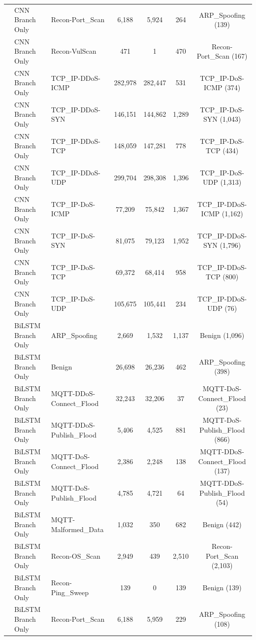 \documentclass[a4paper,fleqn]{cas-sc}
\begin{document}
\begin{landscape}
\begin{longtable}{lllcccc}
 & CNN Branch Only & Recon-Port\_Scan & 6,188 & 5,924 & 264 & ARP\_Spoofing (139) \\
 & CNN Branch Only & Recon-VulScan & 471 & 1 & 470 & Recon-Port\_Scan (167) \\
 & CNN Branch Only & TCP\_IP-DDoS-ICMP & 282,978 & 282,447 & 531 & TCP\_IP-DoS-ICMP (374) \\
 & CNN Branch Only & TCP\_IP-DDoS-SYN & 146,151 & 144,862 & 1,289 & TCP\_IP-DoS-SYN (1,043) \\
 & CNN Branch Only & TCP\_IP-DDoS-TCP & 148,059 & 147,281 & 778 & TCP\_IP-DoS-TCP (434) \\
 & CNN Branch Only & TCP\_IP-DDoS-UDP & 299,704 & 298,308 & 1,396 & TCP\_IP-DoS-UDP (1,313) \\
 & CNN Branch Only & TCP\_IP-DoS-ICMP & 77,209 & 75,842 & 1,367 & TCP\_IP-DDoS-ICMP (1,162) \\
 & CNN Branch Only & TCP\_IP-DoS-SYN & 81,075 & 79,123 & 1,952 & TCP\_IP-DDoS-SYN (1,796) \\
 & CNN Branch Only & TCP\_IP-DoS-TCP & 69,372 & 68,414 & 958 & TCP\_IP-DDoS-TCP (800) \\
 & CNN Branch Only & TCP\_IP-DoS-UDP & 105,675 & 105,441 & 234 & TCP\_IP-DDoS-UDP (76) \\
 & BiLSTM Branch Only & ARP\_Spoofing & 2,669 & 1,532 & 1,137 & Benign (1,096) \\
 & BiLSTM Branch Only & Benign & 26,698 & 26,236 & 462 & ARP\_Spoofing (398) \\
 & BiLSTM Branch Only & MQTT-DDoS-Connect\_Flood & 32,243 & 32,206 & 37 & MQTT-DoS-Connect\_Flood (23) \\
 & BiLSTM Branch Only & MQTT-DDoS-Publish\_Flood & 5,406 & 4,525 & 881 & MQTT-DoS-Publish\_Flood (866) \\
 & BiLSTM Branch Only & MQTT-DoS-Connect\_Flood & 2,386 & 2,248 & 138 & MQTT-DDoS-Connect\_Flood (137) \\
 & BiLSTM Branch Only & MQTT-DoS-Publish\_Flood & 4,785 & 4,721 & 64 & MQTT-DDoS-Publish\_Flood (54) \\
 & BiLSTM Branch Only & MQTT-Malformed\_Data & 1,032 & 350 & 682 & Benign (442) \\
 & BiLSTM Branch Only & Recon-OS\_Scan & 2,949 & 439 & 2,510 & Recon-Port\_Scan (2,103) \\
 & BiLSTM Branch Only & Recon-Ping\_Sweep & 139 & 0 & 139 & Benign (139) \\
 & BiLSTM Branch Only & Recon-Port\_Scan & 6,188 & 5,959 & 229 & ARP\_Spoofing (108) \\

\end{longtable}
\end{landscape}
\end{document}
